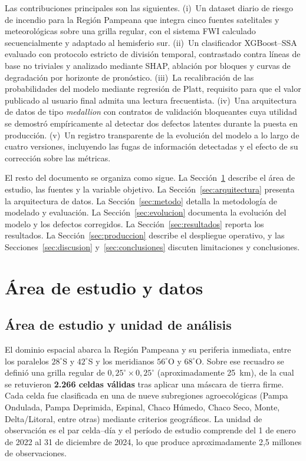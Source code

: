 \documentclass[11pt,a4paper]{article}
\begin{document}
Las contribuciones principales son las siguientes. (i)~Un dataset diario de
riesgo de incendio para la Región Pampeana que integra cinco fuentes
satelitales y meteorológicas sobre una grilla regular, con el sistema FWI
calculado secuencialmente y adaptado al hemisferio sur. (ii)~Un clasificador
XGBoost--SSA evaluado con protocolo estricto de división temporal,
contrastado contra líneas de base no triviales y analizado mediante SHAP,
ablación por bloques y curvas de degradación por horizonte de pronóstico.
(iii)~La recalibración de las probabilidades del modelo mediante regresión
de Platt, requisito para que el valor publicado al usuario final admita una
lectura frecuentista. (iv)~Una arquitectura de datos de tipo \emph{medallion}
con contratos de validación bloqueantes cuya utilidad se demostró
empíricamente al detectar dos defectos latentes durante la puesta en
producción. (v)~Un registro transparente de la evolución del modelo a lo
largo de cuatro versiones, incluyendo las fugas de información detectadas y
el efecto de su corrección sobre las métricas.

El resto del documento se organiza como sigue. La Sección~\ref{sec:datos}
describe el área de estudio, las fuentes y la variable objetivo. La
Sección~\ref{sec:arquitectura} presenta la arquitectura de datos. La
Sección~\ref{sec:metodo} detalla la metodología de modelado y evaluación.
La Sección~\ref{sec:evolucion} documenta la evolución del modelo y los
defectos corregidos. La Sección~\ref{sec:resultados} reporta los
resultados. La Sección~\ref{sec:produccion} describe el despliegue
operativo, y las Secciones~\ref{sec:discusion} y~\ref{sec:conclusiones}
discuten limitaciones y conclusiones.

\section{Área de estudio y datos}
\label{sec:datos}

\subsection{Área de estudio y unidad de análisis}

El dominio espacial abarca la Región Pampeana y su periferia inmediata,
entre los paralelos $28^{\circ}$S y $42^{\circ}$S y los meridianos
$56^{\circ}$O y $68^{\circ}$O. Sobre ese recuadro se definió una grilla
regular de $0{,}25^{\circ} \times 0{,}25^{\circ}$ (aproximadamente 25~km),
de la cual se retuvieron \textbf{2.266 celdas válidas} tras aplicar una
máscara de tierra firme. Cada celda fue clasificada en una de nueve
subregiones agroecológicas (Pampa Ondulada, Pampa Deprimida, Espinal, Chaco
Húmedo, Chaco Seco, Monte, Delta/Litoral, entre otras) mediante criterios
geográficos. La unidad de observación es el par celda--día y el período de
estudio comprende del 1 de enero de 2022 al 31 de diciembre de 2024, lo que
produce aproximadamente 2,5 millones de observaciones.
\end{document}
